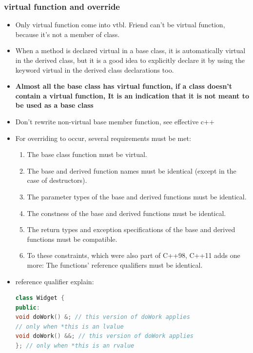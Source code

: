 \documentclass[a4paper,12pt,twoside]{book}
\begin{document}
\begin{itemize}
\end{itemize}


\subsubsection{virtual function and override}
\begin{itemize}

\item Only virtual function come into vtbl. Friend can't be virtual function, because it's not a member of class.

\item When a method is declared virtual in a base class, it is automatically virtual in the derived class, but it is a good idea to explicitly declare it by using the keyword virtual in the derived class declarations too.

\item \textbf{Almost all the base class has virtual function, if a class doesn't contain a virtual function, It is an indication that it is not meant to be used as a base class}

\item Don't rewrite non-virtual base member function, see effective c++

\item For overriding to occur, several requirements must be met:
\begin{enumerate}
\item The base class function must be virtual.
\item The base and derived function names must be identical (except in the case of
destructors).
\item The parameter types of the base and derived functions must be identical.
\item The constness of the base and derived functions must be identical.
\item The return types and exception specifications of the base and derived functions
must be compatible.
\item To these constraints, which were also part of C++98, C++11 adds one more: The functions' reference qualifiers must be identical.
\end{enumerate}
\item reference qualifier explain:
\begin{lstlisting}[frame=single, language=c++]
class Widget {
public:
void doWork() &; // this version of doWork applies
// only when *this is an lvalue
void doWork() &&; // this version of doWork applies
}; // only when *this is an rvalue


\end{lstlisting}
\end{itemize}
\end{document}
